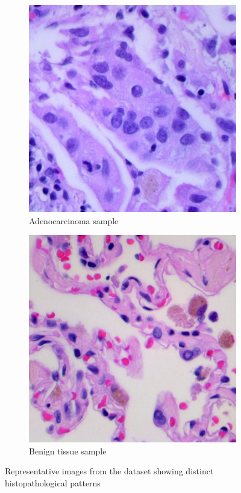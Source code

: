 \documentclass[10pt,twocolumn]{article}
\begin{document}
\begin{figure}[h]
\centering
\begin{subfigure}{0.48\columnwidth}
\includegraphics[width=\linewidth]{imgs/adenocarcinoma.jpg}
\caption{Adenocarcinoma sample}
\end{subfigure}
\hfill
\begin{subfigure}{0.48\columnwidth}
\includegraphics[width=\linewidth]{imgs/benign.jpg}
\caption{Benign tissue sample}
\end{subfigure}
\caption{Representative images from the dataset showing distinct histopathological patterns}
\label{fig:dataset_samples}
\end{figure}
\end{document}
